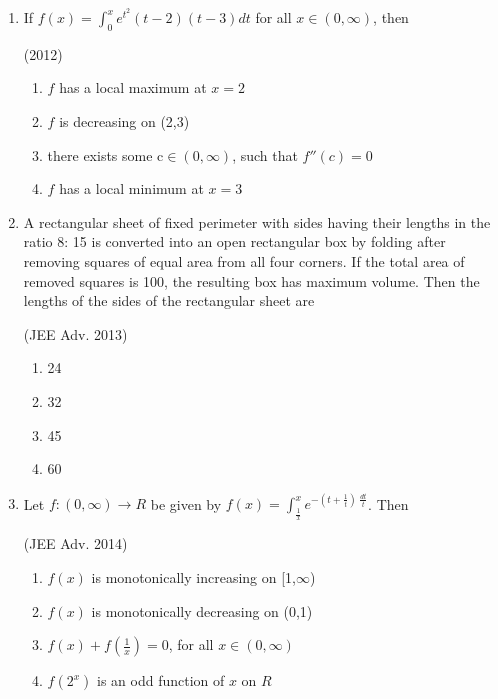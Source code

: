 \documentclass[journal,12pt,twocolumn]{IEEEtran}
\theoremstyle{remark}
\begin{document}
\begin{enumerate}[start = 7]
{        }
    \item{
        
            If $f(x)= \int_{0}^x e^{t^2}(t-2)(t-3)dt$ for all $x \in(0,\infty)$, then
            \begin{flushright}
                {(2012)}
            \end{flushright}
            \begin{enumerate}
                \item $f$ has a local maximum at $x=2$ 
                \item $f$ is decreasing on (2,3)
                \item there exists some c$\in(0,\infty)$, such that $f''(c)=0$
                \item $f$ has a local minimum at $x=3$
            \end{enumerate}
        
        }
        \newpage
    \item{
    
        
            A rectangular sheet of fixed perimeter with sides having their lengths in the ratio 8: 15 is converted into an open rectangular box by folding after removing squares of equal area from all four corners. If the total area of removed squares is 100, the resulting box has maximum volume. Then the lengths of the sides of the rectangular sheet are
            \begin{flushright}
                {(JEE Adv. 2013)}
            \end{flushright}
            \begin{enumerate}
                \item 24
                \item 32
                \item 45
                \item 60
            \end{enumerate}
        
        }
    \item{
        
            Let $f: (0,\infty)\rightarrow R$ be given by $f(x) = \int_{\frac{1}{x}}^x e^{-(t + \frac{1}{t})\ \frac{dt}{t}}$. Then
            \begin{flushright}
                {(JEE Adv. 2014)}
            \end{flushright}
            \begin{enumerate}
                \item $f(x)$ is monotonically increasing on [1,$\infty$)
                \item $f(x)$ is monotonically decreasing on (0,1)
                \item $f(x) + f(\frac{1}{x}) = 0$, for all $x \in (0,\infty)$
                \item $f(2^x)$ is an odd function of $x$ on $R$ 
            \end{enumerate}
        
}
\end{enumerate}
\end{document}
